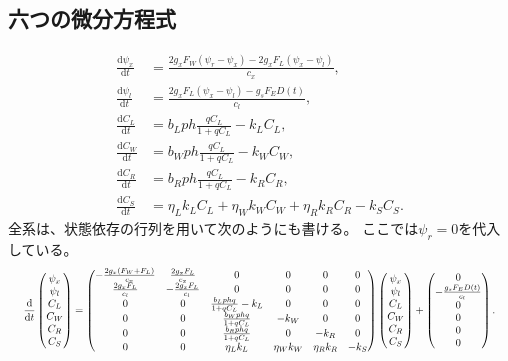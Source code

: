 \documentclass[a4paper,11pt]{ltjsarticle}
\newcommand{\dd}{\mathrm{d}}
\begin{document}
\subsection{六つの微分方程式}
\begin{equation}\label{eq:odes}
\boxed{\begin{aligned}
 \frac{\dd\psi_x}{\dd t}&=\frac{2g_xF_W(\psi_r-\psi_x)-2g_xF_L(\psi_x-\psi_l)}{c_x},\\
 \frac{\dd\psi_l}{\dd t}&=\frac{2g_xF_L(\psi_x-\psi_l)-g_sF_ED(t)}{c_l},\\
 \frac{\dd C_L}{\dd t}&=b_Lp h\frac{qC_L}{1+qC_L}-k_LC_L,\\
 \frac{\dd C_W}{\dd t}&=b_Wp h\frac{qC_L}{1+qC_L}-k_WC_W,\\
 \frac{\dd C_R}{\dd t}&=b_Rp h\frac{qC_L}{1+qC_L}-k_RC_R,\\
 \frac{\dd C_S}{\dd t}&=\eta_Lk_LC_L+\eta_Wk_WC_W+\eta_Rk_RC_R-k_SC_S .
\end{aligned}}
\end{equation}
全系は、状態依存の行列を用いて次のようにも書ける。
ここでは$\psi_r=0$を代入している。
\begin{equation}\label{eq:matrix}
\resizebox{.98\linewidth}{!}{$\displaystyle
\frac{\dd}{\dd t}
\begin{pmatrix}\psi_x\\\psi_l\\C_L\\C_W\\C_R\\C_S\end{pmatrix}
=
\begin{pmatrix}
 -\frac{2g_x(F_W+F_L)}{c_x}&\frac{2g_xF_L}{c_x}&0&0&0&0\\
 \frac{2g_xF_L}{c_l}&-\frac{2g_xF_L}{c_l}&0&0&0&0\\
 0&0&\frac{b_Lphq}{1+qC_L}-k_L&0&0&0\\
 0&0&\frac{b_Wphq}{1+qC_L}&-k_W&0&0\\
 0&0&\frac{b_Rphq}{1+qC_L}&0&-k_R&0\\
 0&0&\eta_Lk_L&\eta_Wk_W&\eta_Rk_R&-k_S
\end{pmatrix}
\begin{pmatrix}\psi_x\\\psi_l\\C_L\\C_W\\C_R\\C_S\end{pmatrix}
+\begin{pmatrix}0\\-\frac{g_sF_ED(t)}{c_l}\\0\\0\\0\\0\end{pmatrix}.$}
\end{equation}
\end{document}
